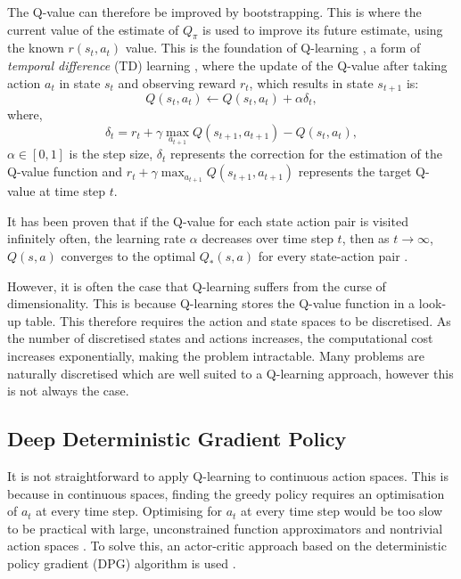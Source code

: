 The Q-value can therefore be improved by bootstrapping. This is where the current value of the estimate of $Q_\pi$ is used to improve its future estimate, using the known $r(s_t,a_t)$ value. This is the foundation of Q-learning \cite{Gay2007}, a form of \textit{temporal difference} (TD) learning \cite{Sutton2015}, where the update of the Q-value after taking action $a_t$ in state $s_t$ and observing reward $r_t$, which results in state $s_{t+1}$ is:
\begin{equation}
Q(s_t,a_t)\leftarrow Q(s_t,a_t)+\alpha\delta_t,
\end{equation}
\noindent where,
\begin{equation}
\delta_t=r_t+\gamma\max_{a_{t+1}}Q(s_{t+1},a_{t+1})-Q(s_{t},a_t),
\end{equation}
\noindent $\alpha\in [0,1]$ is the step size, $\delta_t$ represents the correction for the estimation of the Q-value function and $r_t+\gamma\max_{a_{t+1}}Q(s_{t+1},a_{t+1})$ represents the target Q-value at time step $t$.	


It has been proven that if the Q-value for each state action pair is visited infinitely often, the learning rate $\alpha$ decreases over time step $t$, then as $t\rightarrow \infty$, $Q(s,a)$ converges to the optimal $Q_*(s,a)$ for every state-action pair \cite{Gay2007}.

However, it is often the case that Q-learning suffers from the curse of dimensionality. This is because Q-learning stores the Q-value function in a look-up table. This therefore requires the action and state spaces to be discretised. As the number of discretised states and actions increases, the computational cost increases exponentially, making the problem intractable. Many problems are naturally discretised which are well suited to a Q-learning approach, however this is not always the case. 

\subsection{Deep Deterministic Gradient Policy}


It is not straightforward to apply Q-learning to continuous action spaces. This is because in continuous spaces, finding the greedy policy requires an optimisation of $a_t$ at every time step. Optimising for $a_t$ at every time step would be too slow to be practical with large, unconstrained function approximators and nontrivial action spaces \cite{hunt2016a}. To solve this, an actor-critic approach based on the deterministic policy gradient (DPG) algorithm is used \cite{Silver2014}.


